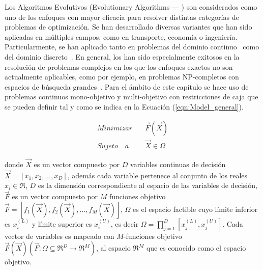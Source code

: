 Los Algoritmos Evolutivos (Evolutionary Algorithms --- \EAS{}) son considerados como uno de los enfoques con mayor eficacia para resolver distintas categorías de 
problemas de optimización.
%
Se han desarrollado diversas variantes que han sido aplicadas en múltiples campos, como en transporte, economía o ingeniería.
%
Particularmente, se han aplicado tanto en problemas del dominio continuo~\cite{glover2005handbook} como del dominio discreto~\cite{Joel:Dynamic_FAP}.
%
En general, los \EAS{} han sido especialmente exitosos en la resolución de problemas complejos en los que los enfoques exactos
no son actualmente aplicables, como por ejemplo, en problemas NP-completos con espacios de búsqueda grandes~\cite{chakraborty2008advances}.
% 
Para el ámbito de este capítulo se hace uso de problemas continuos mono-objetivo y multi-objetivo con restricciones de caja que se pueden definir 
tal y como se indica en la Ecuación (\ref{eqn:Model_general}).

\begin{equation}
 \label{eqn:Model_general}
   \begin{split}
    Minimizar \quad & \vec{F}(\vec{X})\\
   Sujeto \quad a \quad & \vec{X} \in \Omega
   \end{split}
\end{equation}

donde $\vec{X}$ es un vector compuesto por $D$ variables continuas de decisión $\vec{X} = [x_1, x_2, ..., x_D]$, además cada variable pertenece al conjunto de los reales $x_i \in \Re$,
$D$ es la dimensión correspondiente al espacio de las variables de decisión, $\vec{F}$ es un vector compuesto por $M$ funciones objetivo $\vec{F} = [f_1(\vec{X}), f_2(\vec{X}), ..., f_M(\vec{X})]$,
$\Omega$ es el espacio factible cuyo límite inferior es $x_i^{(L)}$ y límite superior es $x_i^{(U)}$, es decir $\Omega = \prod _{j=1}^D[x_j^{(L)}, x_j^{(U)}]$. 
Cada vector de variables es mapeado con $M$-funciones objetivo $\vec{F}(\vec{X})( \vec{F} : \Omega \subseteq \Re^D \rightarrow \Re^M)$, al espacio $\Re^M$ que es conocido como el espacio objetivo.

